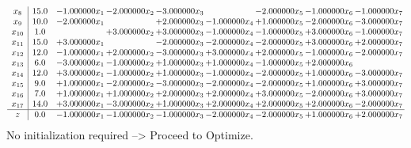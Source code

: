 \documentclass[10pt]{article}
\begin{document}
\[\begin{array}{c| c c@{\hskip 2pt} c@{\hskip 2pt} c@{\hskip 2pt} c@{\hskip 2pt} c@{\hskip 2pt} c@{\hskip 2pt} c@{\hskip 2pt} }
 x_{8}   &  15.0 & -1.000000 x_{1} & -2.000000 x_{2} & -3.000000 x_{3} &   & -2.000000 x_{5} & -1.000000 x_{6} & -1.000000 x_{7}\\
 x_{9}   &  10.0 & -2.000000 x_{1} &   & + 2.000000 x_{3} & -1.000000 x_{4} & + 1.000000 x_{5} & -2.000000 x_{6} & -3.000000 x_{7}\\
 x_{10}   &  1.0  &   & + 3.000000 x_{2} & + 3.000000 x_{3} & -1.000000 x_{4} & -1.000000 x_{5} & + 3.000000 x_{6} & -1.000000 x_{7}\\
 x_{11}   &  15.0 & + 3.000000 x_{1} &   & -2.000000 x_{3} & -2.000000 x_{4} & -2.000000 x_{5} & + 3.000000 x_{6} & + 2.000000 x_{7}\\
 x_{12}   &  12.0 & -1.000000 x_{1} & + 2.000000 x_{2} & -3.000000 x_{3} & + 3.000000 x_{4} & + 2.000000 x_{5} & -1.000000 x_{6} & -2.000000 x_{7}\\
 x_{13}   &  6.0 & -3.000000 x_{1} & -1.000000 x_{2} & + 1.000000 x_{3} & + 1.000000 x_{4} & -1.000000 x_{5} & + 2.000000 x_{6} &   \\
 x_{14}   &  12.0 & + 3.000000 x_{1} & -1.000000 x_{2} & + 1.000000 x_{3} & -1.000000 x_{4} & -2.000000 x_{5} & + 1.000000 x_{6} & -3.000000 x_{7}\\
 x_{15}   &  9.0 & + 1.000000 x_{1} & -2.000000 x_{2} & -3.000000 x_{3} & -2.000000 x_{4} & -2.000000 x_{5} & + 1.000000 x_{6} & + 3.000000 x_{7}\\
 x_{16}   &  7.0 & + 1.000000 x_{1} & + 1.000000 x_{2} & + 2.000000 x_{3} & + 2.000000 x_{4} & + 3.000000 x_{5} & -2.000000 x_{6} & + 3.000000 x_{7}\\
 x_{17}   &  14.0 & + 3.000000 x_{1} & -3.000000 x_{2} & + 1.000000 x_{3} & + 2.000000 x_{4} & + 2.000000 x_{5} & + 2.000000 x_{6} & -2.000000 x_{7}\\
\hline
z    &  0.0 & -1.000000 x_{1} & -1.000000 x_{2} & -1.000000 x_{3} & -2.000000 x_{4} & -2.000000 x_{5} & + 1.000000 x_{6} & + 2.000000 x_{7}\\
\end{array}\]
No initialization required --> Proceed to Optimize. 
\end{document}
